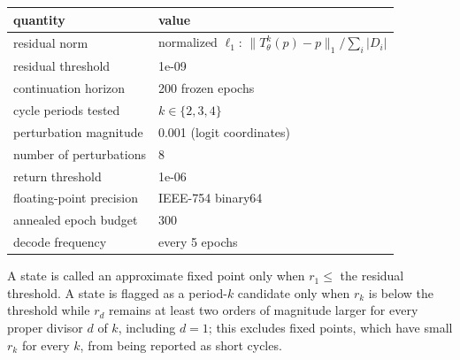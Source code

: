 \begin{table}[htbp]
{\begin{tabular}{ll}
\toprule
quantity & value \\
\midrule
residual norm & normalized $\ell_1$: $\|T^k_{\theta}(p)-p\|_1/\sum_i|D_i|$ \\
residual threshold & 1e-09 \\
continuation horizon & 200 frozen epochs \\
cycle periods tested & $k \in \{2,3,4\}$ \\
perturbation magnitude & 0.001 (logit coordinates) \\
number of perturbations & 8 \\
return threshold & 1e-06 \\
floating-point precision & IEEE-754 binary64 \\
annealed epoch budget & 300 \\
decode frequency & every 5 epochs \\
\bottomrule
\end{tabular}}
{A state is called an approximate fixed point only when $r_1\le$ the residual threshold. A state is flagged as a period-$k$ candidate only when $r_k$ is below the threshold while $r_d$ remains at least two orders of magnitude larger for every proper divisor $d$ of $k$, including $d=1$; this excludes fixed points, which have small $r_k$ for every $k$, from being reported as short cycles.}
\end{table}
